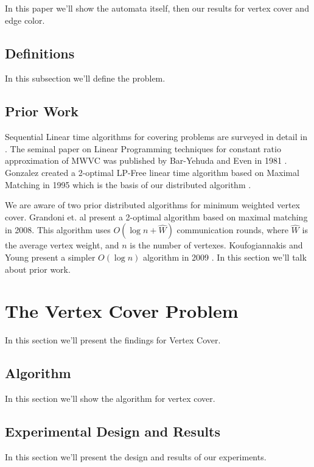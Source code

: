 \documentclass[twoside]{article}
\begin{document}
In this paper we'll show the automata itself, then our results for vertex cover and edge color.

\subsection{Definitions}

In this subsection we'll define the problem.

\subsection{Prior Work}

Sequential Linear time algorithms for covering problems are surveyed in detail in \cite{254190}. The seminal paper on Linear Programming techniques for constant ratio approximation of MWVC was published by Bar-Yehuda and Even in 1981 \cite{Bar-Yehuda:1981lr}. Gonzalez created a 2-optimal LP-Free linear time algorithm based on Maximal Matching in 1995 which is the basis of our distributed algorithm \cite{Gonzalez1995129}. 

We are aware of two prior distributed algorithms for minimum weighted vertex cover. Grandoni et. al present a 2-optimal algorithm based on maximal matching in 2008\cite{1435381}. This algorithm uses $O(\log n + \hat{W})$ communication rounds, where $\hat{W}$ is the average vertex weight, and $n$ is the number of vertexes. Koufogiannakis and Young present a simpler $O(\log n)$ algorithm in 2009 \cite{1582746}.
In this section we'll talk about prior work.

\section{The Vertex Cover Problem}

In this section we'll present the findings for Vertex Cover.

\subsection{Algorithm}

In this section we'll show the algorithm for vertex cover.

\subsection{Experimental Design and Results}

In this section we'll present the design and results of our experiments.
\end{document}
